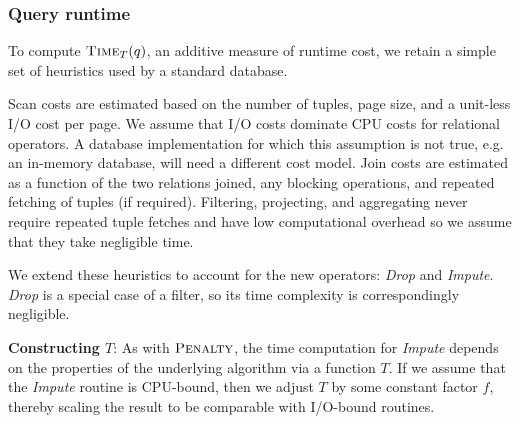 {\subsubsection{Query runtime}
\label{sec:query-runtime}

To compute $\textsc{Time}_{T}(q)$, an additive measure of runtime cost, we retain a simple set of heuristics used by a standard database.


Scan costs are estimated based on the number of tuples, page size, and a unit-less I/O cost per page. 
We assume that I/O costs dominate CPU costs for relational operators. 
A database implementation for which this assumption is not true, e.g. an in-memory database, will need a different cost model.
Join costs are estimated as a function of the two relations joined, any blocking operations, and repeated fetching of tuples (if required).
Filtering, projecting, and aggregating never require repeated tuple fetches and have low computational overhead so we assume that they take negligible time.

We extend these heuristics to account for the new operators: \textit{Drop} and \textit{Impute}.
\textit{Drop} is a special case of a filter, so its time complexity is correspondingly negligible. 

\textbf{Constructing $T$}:
As with $\textsc{Penalty}$, the time computation for \textit{Impute} depends on the properties of the underlying algorithm via a function $T$.
If we assume that the \textit{Impute} routine is CPU-bound, then we adjust $T$ by some constant factor $f$, thereby scaling the result to be comparable with I/O-bound routines.

}
